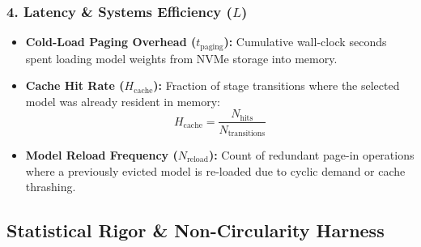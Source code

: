 \subsubsection{4. Latency \& Systems Efficiency (\texorpdfstring{$L$}{L})}
\begin{itemize}
    \item \textbf{Cold-Load Paging Overhead ($t_{\text{paging}}$):} Cumulative wall-clock seconds spent loading model weights from NVMe storage into memory.
    \item \textbf{Cache Hit Rate ($H_{\text{cache}}$):} Fraction of stage transitions where the selected model was already resident in memory:
    \begin{equation}
    H_{\text{cache}} = \frac{N_{\text{hits}}}{N_{\text{transitions}}}
    \end{equation}
    \item \textbf{Model Reload Frequency ($N_{\text{reload}}$):} Count of redundant page-in operations where a previously evicted model is re-loaded due to cyclic demand or cache thrashing.
\end{itemize}

\subsection{Statistical Rigor \& Non-Circularity Harness}
\label{sec:rigor}

